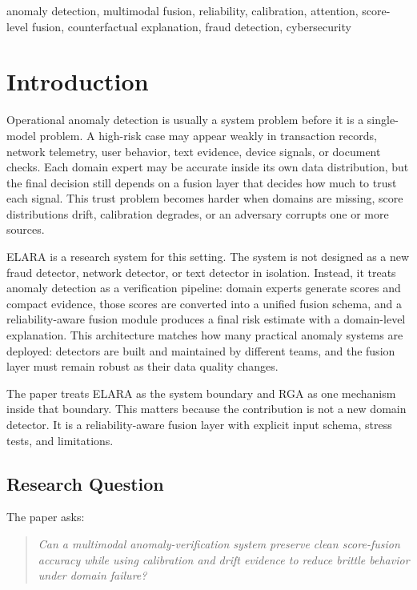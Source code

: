 \documentclass[10pt,conference]{IEEEtran}
\newcommand{\system}{ELARA}
\newcommand{\method}{RGA}
\begin{document}
\begin{IEEEkeywords}
anomaly detection, multimodal fusion, reliability, calibration, attention,
score-level fusion, counterfactual explanation, fraud detection, cybersecurity
\end{IEEEkeywords}

\section{Introduction}
Operational anomaly detection is usually a system problem before it is a
single-model problem. A high-risk case may appear weakly in transaction records,
network telemetry, user behavior, text evidence, device signals, or document
checks. Each domain expert may be accurate inside its own data distribution, but
the final decision still depends on a fusion layer that decides how much to
trust each signal. This trust problem becomes harder when domains are missing,
score distributions drift, calibration degrades, or an adversary corrupts one
or more sources.

\system{} is a research system for this setting. The system is not designed as a
new fraud detector, network detector, or text detector in isolation. Instead,
it treats anomaly detection as a verification pipeline: domain experts generate
scores and compact evidence, those scores are converted into a unified fusion
schema, and a reliability-aware fusion module produces a final risk estimate
with a domain-level explanation. This architecture matches how many practical
anomaly systems are deployed: detectors are built and maintained by different
teams, and the fusion layer must remain robust as their data quality changes.

The paper treats \system{} as the system boundary and \method{} as one
mechanism inside that boundary. This matters because the contribution is not a
new domain detector. It is a reliability-aware fusion layer with explicit input
schema, stress tests, and limitations.

\subsection{Research Question}
The paper asks:
\begin{quote}
\emph{Can a multimodal anomaly-verification system preserve clean score-fusion
accuracy while using calibration and drift evidence to reduce brittle behavior
under domain failure?}
\end{quote}
\end{document}

